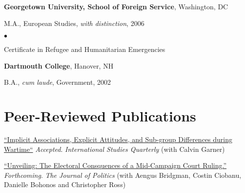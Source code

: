 \documentclass[margin,line]{res}
\newenvironment{list1}{
  \begin{list}{\ding{113}}{%
      \setlength{\itemsep}{0in}
      \setlength{\parsep}{0in} \setlength{\parskip}{0in}
      \setlength{\topsep}{0in} \setlength{\partopsep}{0in} 
      \setlength{\leftmargin}{0.17in}}}{\end{list}}
\newenvironment{list2}{
  \begin{list}{$\bullet$}{%
      \setlength{\itemsep}{0in}
      \setlength{\parsep}{0in} \setlength{\parskip}{0in}
      \setlength{\topsep}{0in} \setlength{\partopsep}{0in} 
      \setlength{\leftmargin}{0.2in}}}{\end{list}}
\begin{document}
{\begin{resume}
{\bf Georgetown University, School of Foreign Service}, Washington, DC 
\begin{list1}
\item[] M.A., European Studies, \emph{with distinction},  2006
  \begin{list2}
\item[] Certificate in Refugee and Humanitarian Emergencies

\end{list2}
\end{list1}

{\bf Dartmouth College}, Hanover, NH
\begin{list1}
\item[] B.A., \emph{cum laude}, Government,  2002
\end{list1}



\section{\sc Peer-Reviewed Publications}
\renewcommand{\labelenumi}{\theenumi.}
\begin{etaremune}

\item \href{}{``Implicit Associations, Explicit Attitudes, and
    Sub-group Differences during Wartime``}
  \emph{Accepted}. \textit{International Studies Quarterly} (with
  Calvin Garner)
  
\item \href{http://www.aaronerlich.com/wp-content/uploads/2020/05/CAN2015_Niqab.pdf}{``Unveiling: The Electoral Consquences of a Mid-Campaign Court
  Ruling.''} \emph{Forthcoming}. \textit{The
  Journal of Politics} (with Aengus Bridgman, Costin Ciobanu, Danielle
Bohonos and Christopher Ross)


\end{etaremune}
\end{resume}}
\end{document}
